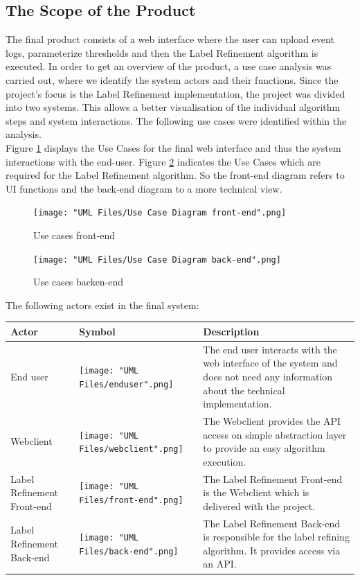 \documentclass[notitlepage]{article}
\begin{document}
\begin{flushleft}
\subsection{The Scope of the Product}
The final product consists of a web interface where the user can upload event logs, parameterize thresholds and then the Label Refinement algorithm is executed. 
In order to get an overview of the product, a use case analysis was carried out, where we identify the system actors and their functions. 
Since the project's focus is the Label Refinement implementation, the project was divided into two systems. 
This allows a better visualisation of the individual algorithm steps and system interactions. The following use cases were identified within the analysis.\\
\medskip
Figure \ref{fig:front-end} displays the Use Cases for the final web interface and thus the system interactions with the end-user.  
Figure \ref{fig:back-end} indicates the Use Cases which are required for the Label Refinement algorithm. So the front-end diagram refers to UI functions  
and the back-end diagram to a more technical view.
\begin{figure}[h!]
  \texttt{[image: "UML Files/Use Case Diagram front-end".png]}
  \caption{Use cases front-end}
  \label{fig:front-end}
\end{figure}

\begin{figure}[h!]
  \texttt{[image: "UML Files/Use Case Diagram back-end".png]}
  \caption{Use cases backen-end}
  \label{fig:back-end}
\end{figure}
\clearpage
The following actors exist in the final system:\\
\medskip
\begin{tabularx}{\textwidth}{|m{4cm}|m{4cm}|m{8cm}|}
	\hline
	\textbf{Actor} 
	&\textbf{Symbol}
	&\textbf{Description}\\
	\hline
	End user & \texttt{[image: "UML Files/enduser".png]} & The end user interacts with the web interface of the system and does not need any information about the technical implementation.\\
	\hline
	Webclient & \texttt{[image: "UML Files/webclient".png]} & The Webclient provides the API access on simple abstraction layer to provide an easy algorithm execution.\\
	\hline
	Label Refinement Front-end & \texttt{[image: "UML Files/front-end".png]} & The Label Refinement Front-end is the Webclient which is delivered with the project. \\
	\hline
	Label Refinement Back-end & \texttt{[image: "UML Files/back-end".png]} & The Label Refinement Back-end is responsible for the label refining algorithm. It provides access via an API. \\
	\hline
\end{tabularx}


\end{flushleft}
\end{document}
